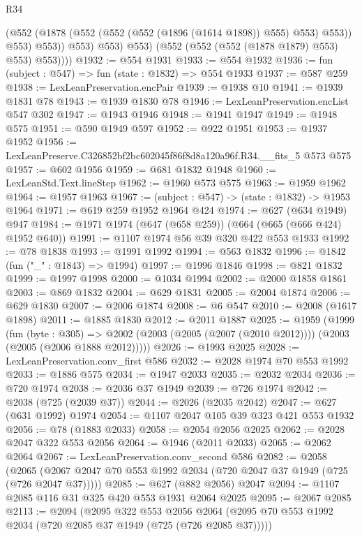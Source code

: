 \begin{lexlean}{R34}
\begin{coremodule}
                    (@552 (@1878 (@552 (@552 (@552 (@1896 (@1614 @1898)) @555) @553) @553)) @553)
                    @553))
                @553)
              @553)
            @553)
          (@552 (@552 (@552 (@1878 @1879) @553) @553) @553))))
@1932 := @554 @1931
@1933 := @554 @1932
@1936 := fun (subject : @547) => fun (state : @1832) => @554 @1933
@1937 := @587 @259
@1938 := LexLeanPreservation.encPair
@1939 := @1938 @10
@1941 := @1939 @1831 @78
@1943 := @1939 @1830 @78
@1946 := LexLeanPreservation.encList @547 @302
@1947 := @1943 @1946
@1948 := @1941 @1947
@1949 := @1948 @575
@1951 := @590 @1949 @597
@1952 := @922 @1951
@1953 := @1937 @1952
@1956 := LexLeanPreserve.C326852bf2bc602045f86f8d8a120a96f.R34.__fits_5 @573 @575
@1957 := @602 @1956
@1959 := @681 @1832 @1948
@1960 := LexLeanStd.Text.lineStep
@1962 := @1960 @573 @575
@1963 := @1959 @1962
@1964 := @1957 @1963
@1967 := (subject : @547) -> (state : @1832) -> @1953 @1964
@1971 := @619 @259 @1952 @1964 @424
@1974 := @627 (@634 @1949) @947
@1984 := @1971 @1974 (@647 (@658 @259)) (@664 (@665 (@666 @424) @1952 @640))
@1991 := @1107 @1974 @56 @39 @320 @422 @553 @1933
@1992 := @78 @1838
@1993 := @1991 @1992
@1994 := @563 @1832
@1996 := @1842 (fun ("_" : @1843) => @1994)
@1997 := @1996 @1846
@1998 := @821 @1832
@1999 := @1997 @1998
@2000 := @1034 @1994
@2002 := @2000 @1858 @1861
@2003 := @869 @1832
@2004 := @629 @1831
@2005 := @2004 @1874
@2006 := @629 @1830
@2007 := @2006 @1874
@2008 := @6 @547
@2010 := @2008 (@1617 @1898)
@2011 := @1885 @1830
@2012 := @2011 @1887
@2025 := @1959
    (@1999
      (fun (byte : @305) =>
      @2002 (@2003 (@2005 (@2007 (@2010 @2012)))) (@2003 (@2005 (@2006 @1888 @2012)))))
@2026 := @1993 @2025
@2028 := LexLeanPreservation.conv_first @586
@2032 := @2028 @1974 @70 @553 @1992
@2033 := @1886 @575
@2034 := @1947 @2033
@2035 := @2032 @2034
@2036 := @720 @1974
@2038 := @2036 @37 @1949
@2039 := @726 @1974
@2042 := @2038 (@725 (@2039 @37))
@2044 := @2026 (@2035 @2042)
@2047 := @627 (@631 @1992) @1974
@2054 := @1107 @2047 @105 @39 @323 @421 @553 @1932
@2056 := @78 (@1883 @2033)
@2058 := @2054 @2056 @2025
@2062 := @2028 @2047 @322 @553 @2056
@2064 := @1946 (@2011 @2033)
@2065 := @2062 @2064
@2067 := LexLeanPreservation.conv_second @586
@2082 := @2058
    (@2065 (@2067 @2047 @70 @553 @1992 @2034 (@720 @2047 @37 @1949 (@725 (@726 @2047 @37)))))
@2085 := @627 (@882 @2056) @2047
@2094 := @1107 @2085 @116 @31 @325 @420 @553 @1931 @2064 @2025
@2095 := @2067 @2085
@2113 := @2094
    (@2095
      @322
      @553
      @2056
      @2064
      (@2095 @70 @553 @1992 @2034 (@720 @2085 @37 @1949 (@725 (@726 @2085 @37)))))

\end{coremodule}
\end{lexlean}
